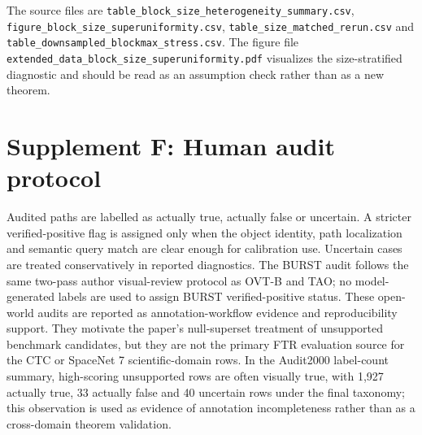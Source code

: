 \documentclass[11pt]{article}
\begin{document}
\begin{table}[h]
\centering
\caption{Block-size heterogeneity robustness status. Materials rows are completed candidate-level diagnostics; CTC and SpaceNet rows are scoped diagnostics because the public package does not contain the necessary candidate-level artifacts.}
\small
{}
\end{table}

The source files are \texttt{table\_block\_size\_heterogeneity\_summary.csv}, \texttt{figure\_block\_size\_superuniformity.csv}, \texttt{table\_size\_matched\_rerun.csv} and \texttt{table\_downsampled\_blockmax\_stress.csv}.
The figure file \texttt{extended\_data\_block\_size\_superuniformity.pdf} visualizes the size-stratified diagnostic and should be read as an assumption check rather than as a new theorem.

\clearpage

\section*{Supplement F: Human audit protocol}

Audited paths are labelled as actually true, actually false or uncertain.
A stricter verified-positive flag is assigned only when the object identity, path localization and semantic query match are clear enough for calibration use.
Uncertain cases are treated conservatively in reported diagnostics.
The BURST audit follows the same two-pass author visual-review protocol as OVT-B and TAO; no model-generated labels are used to assign BURST verified-positive status.
These open-world audits are reported as annotation-workflow evidence and reproducibility support.
They motivate the paper's null-superset treatment of unsupported benchmark candidates, but they are not the primary FTR evaluation source for the CTC or SpaceNet 7 scientific-domain rows.
In the Audit2000 label-count summary, high-scoring unsupported rows are often visually true, with 1,927 actually true, 33 actually false and 40 uncertain rows under the final taxonomy; this observation is used as evidence of annotation incompleteness rather than as a cross-domain theorem validation.
\end{document}

